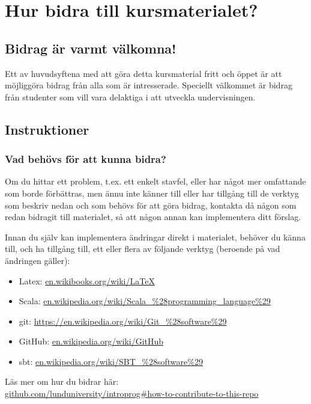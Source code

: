 
\chapter{Hur bidra till kursmaterialet?}\label{appendix:contrib}

\section{Bidrag är varmt välkomna!}

Ett av huvudsyftena med att göra detta kursmaterial fritt och öppet är att möjliggöra bidrag från alla som är intresserade. Speciellt välkommet är bidrag från studenter som vill vara delaktiga i att utveckla undervisningen.

\section{Instruktioner}

\subsection{Vad behövs för att kunna bidra?}

Om du hittar ett problem, t.ex. ett enkelt stavfel, eller har något mer omfattande som borde förbättras, men ännu inte känner till eller har tillgång till de verktyg som beskriv nedan och som behövs för att göra bidrag, kontakta då någon som redan bidragit till materialet, så att någon annan kan implementera ditt förslag.

Innan du själv kan implementera ändringar direkt i materialet, behöver du känna till, och ha tillgång  till, ett eller flera av följande verktyg (beroende på vad ändringen gäller):

\begin{itemize}[noitemsep]
\item Latex: \href{https://en.wikibooks.org/wiki/LaTeX}{en.wikibooks.org/wiki/LaTeX}
\item Scala: \href{https://en.wikipedia.org/wiki/Scala\_\%28programming_language\%29}{en.wikipedia.org/wiki/Scala\_\%28programming\_language\%29}
\item git: \href{https://en.wikipedia.org/wiki/Git\_\%28software\%29}{https://en.wikipedia.org/wiki/Git\_\%28software\%29}
\item GitHub: \href{https://en.wikipedia.org/wiki/GitHub}{en.wikipedia.org/wiki/GitHub}
\item sbt: \href{https://en.wikipedia.org/wiki/SBT\_\%28software\%29}{en.wikipedia.org/wiki/SBT\_\%28software\%29}
\end{itemize}
Läs mer om hur du bidrar här: \\ \href{https://github.com/lunduniversity/introprog#how-to-contribute-to-this-repo}{github.com/lunduniversity/introprog\#how-to-contribute-to-this-repo}



